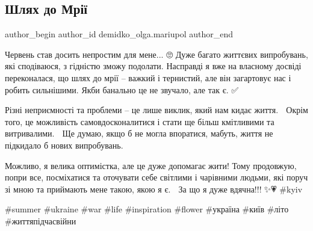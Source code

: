  
 
 
 
 

\subsection{Шлях до Мрії}
\label{sec:18_06_2023.fb.demidko_olga.mariupol.1.road_to_dream}

\ifcmt
 author_begin
   author_id demidko_olga.mariupol
 author_end
\fi

Червень став досить непростим для мене... 🙄 Дуже багато життєвих випробувань,
які  сподіваюся, з гідністю зможу подолати. Насправді я вже на власному досвіді
переконалася, що шлях до мрії – важкий і тернистий, але він загартовує нас і
робить сильнішими. Якби банально це не звучало, але так є. ✅️💪

Різні неприємності та проблеми – це лише виклик, який нам кидає життя. 🤺 Окрім
того, це можливість самовдосконалитися і стати ще більш кмітливими та
витривалими. 🦸 Ще думаю, якщо б не могла впоратися, мабуть, життя не
підкидало б нових випробувань.🤔 

Можливо, я велика оптимістка, але це дуже допомагає жити! Тому продовжую, попри
все, посміхатися та оточувати себе  світлими і чарівними людьми, які поруч зі
мною та приймають мене такою, якою я є. 🥰 За що я дуже вдячна!!!🙏✨️💗 \#kyiv

\#summer \#ukraine \#war \#life \#inspiration \#flower \#україна \#київ \#літо
\#життяпідчасвійни

